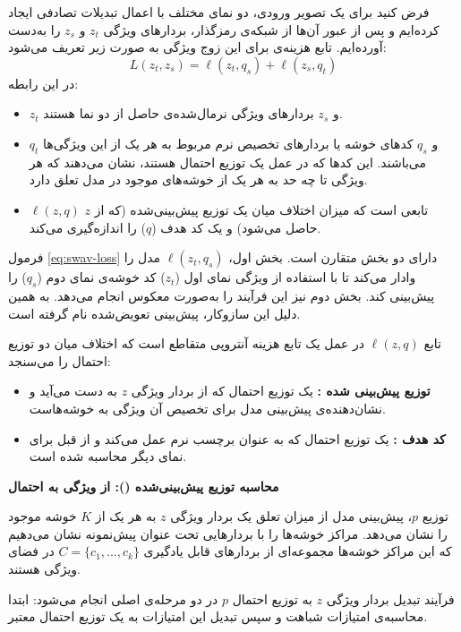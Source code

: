 فرض کنید برای یک تصویر ورودی، دو نمای مختلف با اعمال تبدیلات تصادفی ایجاد کرده‌ایم و پس از عبور آن‌ها از شبکه‌ی رمزگذار، بردارهای ویژگی
$z_t$ و $z_s$ را به‌دست آورده‌ایم.
تابع هزینه‌ی  برای این زوج ویژگی به صورت زیر تعریف می‌شود:
\begin{equation}
    L(z_t, z_s) = \ell(z_t, q_s) + \ell(z_s, q_t)
    \label{eq:swav-loss}
\end{equation}
در این رابطه:
\begin{itemize}
    \item $z_t$ و $z_s$ بردارهای ویژگی نرمال‌شده‌ی حاصل از دو نما هستند.
    \item $q_t$ و $q_s$ کدهای خوشه یا بردارهای تخصیص نرم مربوط به هر یک از این ویژگی‌ها می‌باشند. این کدها که در عمل یک توزیع احتمال هستند، نشان می‌دهند که هر ویژگی تا چه حد به هر یک از خوشه‌های موجود در مدل تعلق دارد.
    \item $\ell(z,q)$ تابعی است که میزان اختلاف میان یک توزیع پیش‌بینی‌شده (که از $z$ حاصل می‌شود) و یک کد هدف ($q$) را اندازه‌گیری می‌کند.
\end{itemize}
فرمول \ref{eq:swav-loss} دارای دو بخش متقارن است. بخش اول، $\ell(z_t,q_s)$
مدل را وادار می‌کند تا با استفاده از ویژگی نمای اول ($z_t$) کد خوشه‌ی نمای دوم ($q_s$) را پیش‌بینی کند. بخش دوم نیز این فرآیند را به‌صورت معکوس انجام می‌دهد. به همین دلیل این سازوکار، پیش‌بینی تعویض‌شده نام گرفته است.

تابع $\ell(z,q)$ در عمل یک تابع هزینه آنتروپی متقاطع است که اختلاف میان دو توزیع احتمال را می‌سنجد:
\begin{itemize}
    \item\textbf{توزیع پیش‌بینی شده :} یک توزیع احتمال که از بردار ویژگی $z$ به دست می‌آید و نشان‌دهنده‌ی پیش‌بینی مدل برای تخصیص آن ویژگی به خوشه‌هاست.
    \item\textbf{کد هدف :} یک توزیع احتمال که به عنوان برچسب نرم عمل می‌کند و از قبل برای نمای دیگر محاسبه شده است.
\end{itemize}

\noindent\textbf{محاسبه توزیع پیش‌بینی‌شده (): از ویژگی به احتمال}

توزیع $p$،
پیش‌بینی مدل از میزان تعلق یک بردار ویژگی $z$
به هر یک از $K$ خوشه موجود را نشان می‌دهد. مراکز خوشه‌ها را با بردارهایی تحت عنوان پیش‌نمونه نشان می‌دهیم که این مراکز خوشه‌ها مجموعه‌ای از بردارهای قابل یادگیری $C=\{c_1,...,c_k\}$
در فضای ویژگی هستند.

فرآیند تبدیل بردار ویژگی 
$z$
به توزیع احتمال 
$p$
در دو مرحله‌ی اصلی انجام می‌شود: ابتدا محاسبه‌ی امتیازات شباهت و سپس تبدیل این امتیازات به یک توزیع احتمال معتبر.

